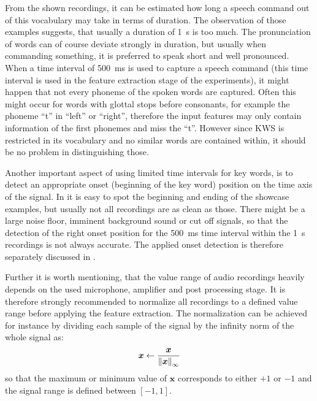 \FloatBarrier
\noindent
From the shown recordings, it can be estimated how long a speech command out of this vocabulary may take in terms of duration.
The observation of those examples suggests, that usually a duration of \SI{1}{\second} is too much.
The pronunciation of words can of course deviate strongly in duration, but usually when commanding something, it is preferred to speak short and well pronounced.
When a time interval of \SI{500}{\milli\second} is used to capture a speech command (this time interval is used in the feature extraction stage of the experiments), it might happen that not every phoneme of the spoken words are captured.
Often this might occur for words with glottal stops before consonants, for example the phoneme \enquote{t} in \enquote{left} or \enquote{right}, therefore the input features may only contain information of the first phonemes and miss the \enquote{t}.
However since KWS is restricted in its vocabulary and no similar words are contained within, it should be no problem in distinguishing those.

Another important aspect of using limited time intervals for key words, is to detect an appropriate onset (beginning of the key word) position on the time axis of the signal.
In  it is easy to spot the beginning and ending of the showcase examples, but usually not all recordings are as clean as those.
There might be a large noise floor, imminent background sound or cut off signals, so that the detection of the right onset position for the \SI{500}{\milli\second} time interval within the \SI{1}{\second} recordings is not always accurate.
The applied onset detection is therefore separately discussed in .

Further it is worth mentioning, that the value range of audio recordings heavily depends on the used microphone, amplifier and post processing stage.
It is therefore strongly recommended to normalize all recordings to a defined value range before applying the feature extraction.
The normalization can be achieved for instance by dividing each sample of the signal by the infinity norm of the whole signal as:
\begin{equation}
  \bm{x} \gets \frac{\bm{x}}{\norm{\bm{x}}_\infty}
\end{equation}
so that the maximum or minimum value of $\bm{x}$ corresponds to either $+1$ or $-1$ and the signal range is defined between $[-1, 1]$.